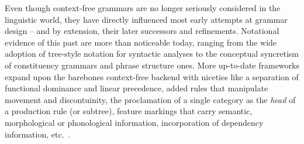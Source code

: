Even though context-free grammars are no longer seriously considered in the linguistic world, they have directly influenced most early attempts at grammar design -- and by extension, their later successors and refinements.
Notational evidence of this past are more than noticeable today, ranging from the wide adoption of tree-style notation for syntactic analyses to the conceptual syncretism of constituency grammars and phrase structure ones.
More up-to-date frameworks expand upon the barebones context-free backend with niceties like a separation of functional dominance and linear precedence, added rules that manipulate movement and discontuinity, the proclamation of a single category as the \textit{head} of a production rule (or subtree), feature markings that carry semantic, morphological or phonological information, incorporation of dependency information, etc.~\cite[\textit{inter alia}]{gazdar1985generalized,jacobson1987phrase,pollard1994head,dalrymple2001lexical}.


